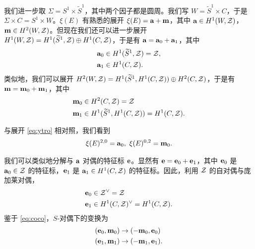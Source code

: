 我们进一步取 $\Sigma=S^1\times \tilde S^1$，其中两个因子都是圆周。我们写 $W=\tilde S^1\times C$，于是 $\Sigma\times C=S^1\times W$。$\xi(E)$ 有熟悉的展开 $\xi(E)={\bf a}+{\bf m}$，其中 ${\bf a}\in H^1(W,\CZ)$，${\bf m}\in H^2(W,\CZ)$。但现在我们还可以进一步展开 $H^1(W,\CZ)=H^1(\tilde S^1,\CZ)\oplus H^1(C,\CZ)$，于是有 ${\bf a}={\bf a}_0+{\bf a}_1$，其中 %
\setcounter{equation}{19}
\begin{equation}\label{eq:mimot}
\begin{aligned}{\bf
a}_0&\in H^1(\tilde S^1,\CZ) =\CZ,\\ {\bf a}_1& \in
H^1(C,\CZ).
\end{aligned}
\end{equation}
类似地，我们可以展开 $H^2(W,\CZ)=H^1(\tilde S^1,H^1(C,\CZ))\oplus H^2(C,\CZ)$，于是有 ${\bf m}={\bf m}_0+{\bf m}_1$，其中 %
\setcounter{equation}{20}
\begin{equation}\label{eq:nimot}
\begin{aligned}{\bf
m}_0&\in H^2(C,\CZ)=\CZ \\
                     {\bf m}_1&\in
                     H^1(\tilde S^1,H^1(C,\CZ))=H^1(C,\CZ).
\end{aligned}
\end{equation}

与展开 \eqref{eq:ytro} 相对照，我们看到
\setcounter{equation}{21}
\begin{equation}\label{eq:zimot}
\xi(E)^{2,0}={\bf a}_0,~\xi(E)^{0,2}={\bf m}_0.
\end{equation}

我们可以类似地分解与 $\bf a$ 对偶的特征标 $\bf e$。显然有 ${\bf e}={\bf e}_0+{\bf e}_1$，其中 ${\bf e}_0$ 是 ${\bf a}_0\in \CZ$ 的特征标，${\bf e}_1$ 是 ${\bf a}_1\in H^1(C,\CZ)$ 的特征标。因此，利用 $\CZ$ 的自对偶与庞加莱对偶， %
\setcounter{equation}{22}
\begin{equation}\label{eq:tew}
\begin{aligned} {\bf e}_0 & \in
\CZ^\vee=\CZ\\ {\bf e}_1&\in H^1(C,\CZ)^\vee=H^1(C,\CZ).
\end{aligned}
\end{equation}
鉴于 \eqref{eq:coco}，$S$-对偶下的变换为
\setcounter{equation}{23}
\begin{equation}\label{eq:niko}
\begin{aligned}({\bf e}_0,{\bf m}_0)&\to (-{\bf m}_0,{\bf
e}_0)\\ ({\bf e}_1,{\bf m}_1)&\to (-{\bf m}_1,{\bf e}_1).
\end{aligned}
\end{equation}

